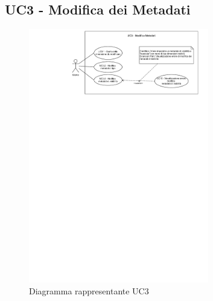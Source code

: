 \subsection{UC3 - Modifica dei Metadati}
\label{sub:uc3}

\begin{figure}[h]
    \centering
    \includegraphics[width=0.7\textwidth]{componenti/casi-duso/diagrammi/UC3.pdf}
    \caption{Diagramma rappresentante UC3}
    \label{fig:UC3}
\end{figure}

